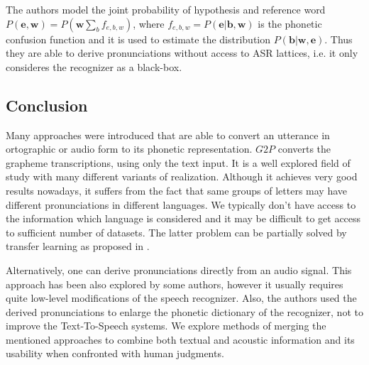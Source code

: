 The authors model the joint probability of hypothesis and reference word $P(\mathbf{e}, \mathbf{w}) = P(\mathbf{w}\sum_b f_{e,b,w})$, where $f_{e,b,w} = P(\mathbf{e}\vert \mathbf{b}, \mathbf{w})$ is the phonetic confusion function and it is used to estimate the distribution $P(\mathbf{b}\vert\mathbf{w},\mathbf{e})$.
Thus they are able to derive pronunciations without access to ASR lattices, i.e. it only consideres the recognizer as a black-box. 
\subsection{Conclusion}
Many approaches were introduced that are able to convert an utterance in ortographic or audio form to its phonetic representation.
$G2P$ converts the grapheme transcriptions, using only the text input.
It is a well explored field of study with many different variants of realization.
Although it achieves very good results nowadays, it suffers from the fact that same groups of letters may have different pronunciations in different languages.
We typically don't have access to the information which language is considered and it may be difficult to get access to sufficient number of datasets.
The latter problem can be partially solved by transfer learning as proposed in \cite{deri2016grapheme}.
\par
Alternatively, one can derive pronunciations directly from an audio signal.
This approach has been also explored by some authors, however it usually requires quite low-level modifications of the speech recognizer.
Also, the authors used the derived pronunciations to enlarge the phonetic dictionary of the recognizer, not to improve the Text-To-Speech systems.
We explore methods of merging the mentioned approaches to combine both textual and acoustic information and its usability when confronted with human judgments.